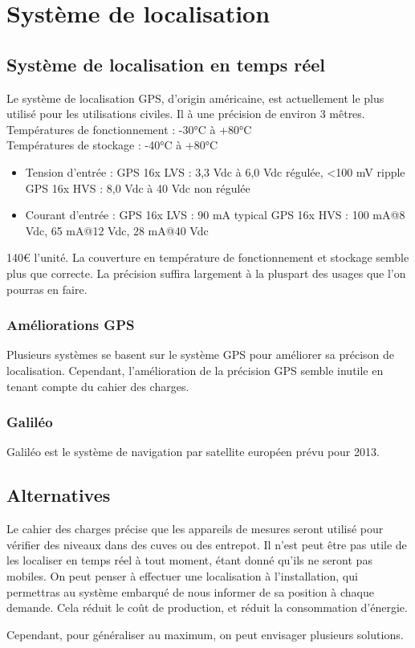 \section{Système de localisation}

    \subsection{Système de localisation en temps réel}
        { Le système de localisation GPS, d'origin américaine, est actuellement le plus utilisé pour les utilisations civiles.
          Il à une précision de environ 3 mêtres.}
        { Températures de fonctionnement : -30°C à +80°C\\
          Températures de stockage : -40°C à +80°C}
        { \begin{itemize}
                \item Tension d'entrée :
                    \subitem GPS 16x LVS : 3,3 Vdc à 6,0 Vdc régulée, <100 mV ripple
                    \subitem GPS 16x HVS : 8,0 Vdc à 40 Vdc non régulée
                \item Courant d'entrée :
                    \subitem GPS 16x LVS : 90 mA typical
                    \subitem GPS 16x HVS : 100 mA@8 Vdc, 65 mA@12 Vdc, 28 mA@40 Vdc
          \end{itemize}
        }
        { 140€ l'unité.
        }
        {}
        {La couverture en température de fonctionnement et stockage semble plus que correcte. La précision suffira largement à la pluspart des usages que l'on pourras en faire.}
	        
	    \subsubsection{Améliorations GPS}
	        Plusieurs systèmes se basent sur le système GPS pour améliorer sa précison de localisation.
	        Cependant, l'amélioration de la précision GPS semble inutile en tenant compte du cahier des charges.

        \subsubsection{Galiléo}
	        Galiléo est le système de navigation par satellite européen prévu pour 2013.
	        
    \subsection{Alternatives}
        Le cahier des charges précise que les appareils de mesures seront utilisé pour vérifier des niveaux dans des cuves ou des entrepot.
        Il n'est peut être pas utile de les localiser en temps réel à tout moment, étant donné qu'ils ne seront pas mobiles.
        On peut penser à effectuer une localisation à l'installation, qui permettras au système embarqué de nous informer de sa position à chaque demande.
        Cela réduit le coût de production, et réduit la consommation d'énergie.
        
        Cependant, pour généraliser au maximum, on peut envisager plusieurs solutions.
